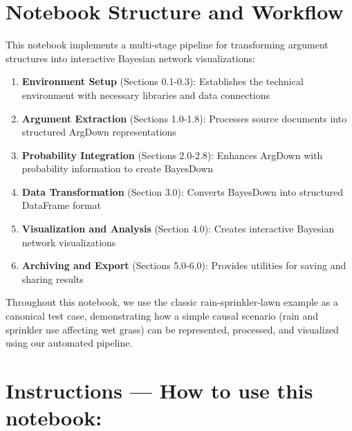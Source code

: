 \documentclass[
  11pt,
  letterpaper,
]{book}
\begin{document}
\section{Notebook Structure and
Workflow}\label{notebook-structure-and-workflow}

This notebook implements a multi-stage pipeline for transforming
argument structures into interactive Bayesian network visualizations:

\begin{enumerate}
\def\labelenumi{\arabic{enumi}.}
\setcounter{enumi}{-1}
\item
  \textbf{Environment Setup} (Sections 0.1-0.3): Establishes the
  technical environment with necessary libraries and data connections
\item
  \textbf{Argument Extraction} (Sections 1.0-1.8): Processes source
  documents into structured ArgDown representations
\item
  \textbf{Probability Integration} (Sections 2.0-2.8): Enhances ArgDown
  with probability information to create BayesDown
\item
  \textbf{Data Transformation} (Section 3.0): Converts BayesDown into
  structured DataFrame format
\item
  \textbf{Visualization and Analysis} (Section 4.0): Creates interactive
  Bayesian network visualizations
\item
  \textbf{Archiving and Export} (Sections 5.0-6.0): Provides utilities
  for saving and sharing results
\end{enumerate}

Throughout this notebook, we use the classic rain-sprinkler-lawn example
as a canonical test case, demonstrating how a simple causal scenario
(rain and sprinkler use affecting wet grass) can be represented,
processed, and visualized using our automated pipeline.

\section{Instructions --- How to use this
notebook:}\label{instructions-how-to-use-this-notebook}
\end{document}
